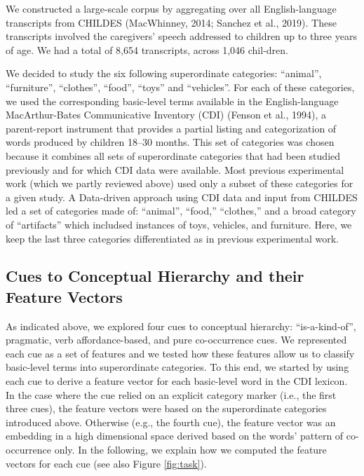 \documentclass[english,,man,floatsintext]{apa6}
\begin{document}
We constructed a large-scale corpus by aggregating over all English-language transcripts from CHILDES (MacWhinney, 2014; Sanchez et al., 2019). These transcripts involved the caregivers' speech addressed to children up to three years of age. We had a total of 8,654 transcripts, across 1,046 chil-dren.

We decided to study the six following superordinate categories: \enquote{animal}, \enquote{furniture}, \enquote{clothes}, \enquote{food}, \enquote{toys} and \enquote{vehicles}. For each of these categories, we used the corresponding basic-level terms available in the English-language MacArthur-Bates Communicative Inventory (CDI) (Fenson et al., 1994), a parent-report instrument that provides a partial listing and categorization of words produced by children 18--30 months. This set of categories was chosen because it combines all sets of
superordinate categories that had been studied previously and for which CDI data were available.
Most previous experimental work (which we partly reviewed above) used only a subset of these categories for a given study. A Data-driven approach using CDI data and input from CHILDES led a set of categories made of: \enquote{animal}, \enquote{food,} \enquote{clothes,} and a broad category of \enquote{artifacts} which includsed instances of toys, vehicles, and furniture. Here, we keep the last three categories differentiated as in previous experimental work.

\hypertarget{cues-to-conceptual-hierarchy-and-their-feature-vectors}{%
\subsection{Cues to Conceptual Hierarchy and their Feature Vectors}\label{cues-to-conceptual-hierarchy-and-their-feature-vectors}}

As indicated above, we explored four cues to conceptual hierarchy: \enquote{is-a-kind-of}, pragmatic, verb affordance-based, and pure co-occurrence cues.
We represented each cue as a set of features and we tested how these features allow us to classify basic-level terms into superordinate
categories. To this end, we started by using each cue to derive a feature vector for each basic-level word in the CDI lexicon. In the case where the cue relied on an explicit category marker (i.e., the first three cues), the feature vectors were based on the superordinate categories introduced above. Otherwise (e.g., the fourth cue), the feature vector was an embedding in a high dimensional space derived based on the words' pattern of co-occurrence only. In the following, we explain how we computed the feature vectors for each cue (see also Figure \ref{fig:task}).
\end{document}
